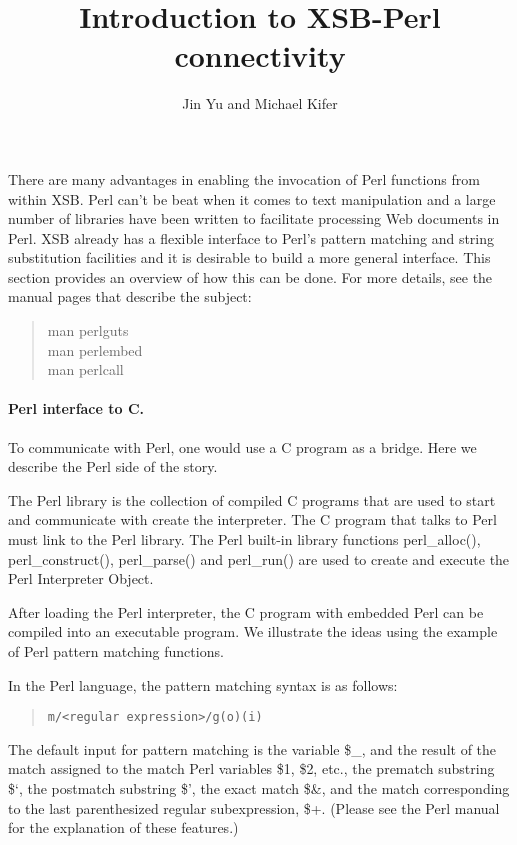 \documentclass{article}
\begin{document}
\title{Introduction to XSB-Perl connectivity}
\author{Jin Yu and Michael Kifer}

\maketitle

There are many advantages in enabling the invocation of Perl functions from
within XSB. Perl can't be beat when it comes to text manipulation and a
large number of libraries have been written to facilitate processing Web
documents in Perl. XSB already has a flexible interface to Perl's pattern
matching and string substitution facilities and it is desirable to build
a more general interface. This section provides an overview of how this can
be done. For more details, see the manual pages that describe the subject:
\begin{quote}
 man perlguts\\
 man perlembed\\
 man perlcall
\end{quote}


\paragraph{Perl interface to C.}
To communicate with Perl, one would use a C program as a bridge.
Here we describe the Perl side of the story.

The Perl library is the collection of compiled C programs that are used to
start and communicate with create the interpreter. The C program that talks
to Perl must link to the Perl library. The Perl built-in library functions
perl{\_}alloc(), perl{\_}construct(), perl{\_}parse() and perl{\_}run() are
used to create and execute the Perl Interpreter Object.

After loading the Perl interpreter, the C program with
embedded Perl can be compiled into an executable program.
We illustrate the ideas using the example of Perl pattern matching
functions.

In the Perl language, the pattern matching syntax is as follows:

\begin{quote}
 {\tt  m/<regular expression>/g(o)(i) }
\end{quote}



The default input for pattern matching is the variable {\$}{\_}, and the
result of the match assigned to the match Perl variables {\$}1, {\$}2,
etc., the prematch substring {\$}`, the postmatch substring {\$}', the
exact match {\$}{\&}, and the match corresponding to the last parenthesized
regular subexpression, {\$}+. (Please see the Perl manual for the
explanation of these features.)
\end{document}
